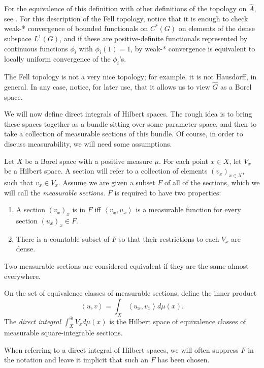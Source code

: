 For the equivalence of this definition with other definitions of the topology on $\hat A$, see \cite[Theorem 3.4.10]{Dixmier-Cstar}. For this description of the Fell topology, notice that it is enough to check weak-* convergence of bounded functionals on $C^*(G)$ on elements of the dense subspace $L^1(G)$, and if these are positive-definite functionals represented by continuous functions $\phi_i$ with $\phi_i(1)=1$, by \cite[Theorem 13.5.2]{Dixmier-Cstar} weak-* convergence is equivalent to locally uniform convergence of the $\phi_i$'s. 

The Fell topology is not a very nice topology; for example, it is not Hausdorff, in general. In any case,  notice, for later use, that it allows us to view $\hat{G}$ as a Borel space.




We will now define direct integrals of Hilbert spaces. The rough idea is to bring these spaces together as a bundle sitting over some parameter space, and then to take a collection of measurable sections of this bundle. Of course, in order to discuss measurability, we will need some assumptions.

\begin{definition}
\label{definition-direct-integral}
Let $X$ be a Borel space with a positive measure $\mu$. For each point $x\in X$, let $V_x$ be a Hilbert space. A section will refer to a collection of elements $(v_x)_{x\in X}$, such that $v_x\in V_x$. Assume we are given a subset $F$ of all of the sections, which we will call the {\it measurable sections}. $F$ is required to have two properties:
\begin{enumerate}
\item A section $(v_x)_x$ is in $F$ iff $\left <v_x,u_x\right >$ is a measurable function for every section $(u_x)_x\in F$.
\item There is a countable subset of $F$ so that their restrictions to each $V_x$ are dense.
\end{enumerate}
Two measurable sections are considered equivalent if they are the same almost everywhere.

On the set of equivalence classes of measurable sections, define the inner product
$$\left <u,v\right > = \int_X \left <u_x,v_x\right > d\mu (x).$$
The {\it direct integral} $\int_X^{\oplus} V_x d\mu (x)$ is the Hilbert space of equivalence classes of measurable square-integrable sections. 
\end{definition}
When referring to a direct integral of Hilbert spaces, we will often suppress $F$ in the notation and leave it implicit that such an $F$ has been chosen.

